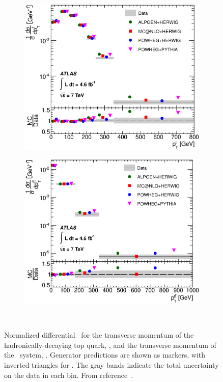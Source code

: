 \begin{figure}[!t]
\begin{center}
  \begin{subfigure}{0.49\textwidth}{\includegraphics[width=\textwidth]{Modeling/Figures/fig_08a}}\label{fig:diffxsec_a}
    \end{subfigure}
  \begin{subfigure}{0.49\textwidth}{\includegraphics[width=\textwidth]{Modeling/Figures/fig_08c}}\label{fig:diffxsec_c}
    \end{subfigure} \\
\caption{
  Normalized differential \xsecs\ for the transverse momentum of the hadronically-decaying top quark, \toppt, and the transverse momentum of the \ttbar\ system, \ttbarpt. Generator predictions are shown as markers, with inverted triangles for \PP. The gray bands indicate the total uncertainty on the data in each bin. From reference~\cite{Aad:2014zka}. 
}
\label{fig:diffxsec}
\end{center}
\end{figure}

